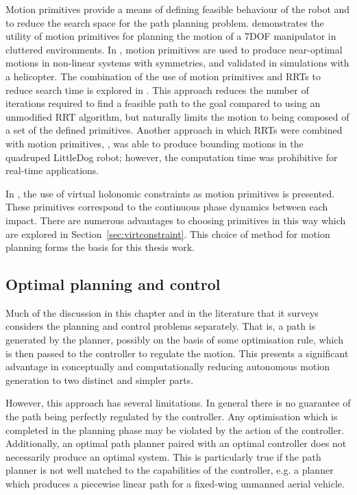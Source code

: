 Motion primitives provide a means of defining feasible behaviour of the robot and to reduce the search space for the path planning problem. \cite{cohen2011planning} demonstrates the utility of motion primitives for planning the motion of a 7DOF manipulator in cluttered environments. In \cite{frazzoli2005maneuver}, motion primitives are used to produce near-optimal motions in non-linear systems with symmetries, and validated in simulations with a helicopter. The combination of the use of motion primitives and RRTs to reduce search time is explored in \cite{vonasek2013global}. This approach reduces the number of iterations required to find a feasible path to the goal compared to using an unmodified RRT algorithm, but naturally limits the motion to being composed of a set of the defined primitives. Another approach in which RRTs were combined with motion primitives, \cite{shkolnik2011bounding}, was able to produce bounding motions in the quadruped LittleDog robot; however, the computation time was prohibitive for real-time applications. 

In \cite{manchester13planning}, the use of virtual holonomic constraints as motion primitives is presented. These primitives correspond to the continuous phase dynamics between each impact. There are numerous advantages to choosing primitives in this way which are explored in Section~\ref{sec:virtconstraint}. This choice of method for motion planning forms the basis for this thesis work.

\subsection{Optimal planning and control}
Much of the discussion in this chapter and in the literature that it surveys considers the planning and control problems separately. That is, a path is generated by the planner, possibly on the basis of some optimisation rule, which is then passed to the controller to regulate the motion. This presents a significant advantage in conceptually and computationally reducing autonomous motion generation to two distinct and simpler parts.

However, this approach has several limitations. In general there is no guarantee of the path being perfectly regulated by the controller. Any optimisation which is completed in the planning phase may be violated by the action of the controller. Additionally, an optimal path planner paired with an optimal controller does not necessarily produce an optimal system. This is particularly true if the path planner is not well matched to the capabilities of the controller, e.g. a planner which produces a piecewise linear path for a fixed-wing unmanned aerial vehicle.

